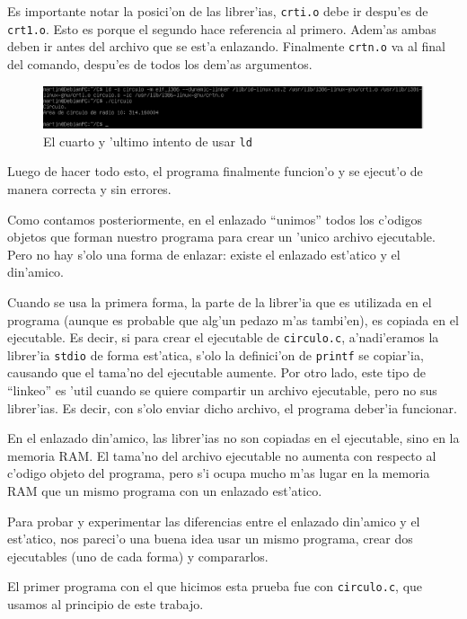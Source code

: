 \documentclass[11pt]{article}
\begin{document}
		Es importante notar la posici'on de las librer'ias, \texttt{crti.o} debe ir despu'es de \texttt{crt1.o}. Esto es porque el segundo hace referencia al primero. Adem'as ambas deben ir antes del archivo que se est'a enlazando. Finalmente \texttt{crtn.o} va al final del comando, despu'es de todos los dem'as argumentos.
		
		\begin{figure}[H]
			\centering
			\includegraphics[width=.9\linewidth]{Images/Seccion 1/S1 parte nueve.PNG}
			\caption{El cuarto y 'ultimo intento de usar \texttt{ld}}
			\label{fig:fourth-ld-attempt}
		\end{figure}
		
		Luego de hacer todo esto, el programa finalmente funcion'o y se ejecut'o de manera correcta y sin errores. 


		Como contamos posteriormente, en el enlazado ``unimos'' todos los c'odigos objetos que forman nuestro programa para crear un 'unico archivo ejecutable. Pero no hay s'olo una forma de enlazar: existe el enlazado est'atico y el din'amico.

		Cuando se usa la primera forma, la parte de la librer'ia que es utilizada en el programa (aunque es probable que alg'un pedazo m'as tambi'en), es copiada en el ejecutable. Es decir, si para crear el ejecutable de \texttt{circulo.c}, a'nadi'eramos la librer'ia \texttt{stdio} de forma est'atica, s'olo la definici'on de \texttt{printf} se copiar'ia, causando que el tama'no del ejecutable aumente. Por otro lado, este tipo de ``linkeo'' es 'util cuando se quiere compartir un archivo ejecutable, pero no sus librer'ias. Es decir, con s'olo enviar dicho archivo, el programa deber'ia funcionar.

		En el enlazado din'amico, las librer'ias no son copiadas en el ejecutable, sino en la memoria RAM. El tama'no del archivo ejecutable no aumenta con respecto al c'odigo objeto del programa, pero s'i ocupa mucho m'as lugar en la memoria RAM que un mismo programa con un enlazado est'atico. 

		Para probar y experimentar las diferencias entre el enlazado din'amico y el est'atico, nos pareci'o una buena idea usar un mismo programa, crear dos ejecutables (uno de cada forma) y compararlos.

		El primer programa con el que hicimos esta prueba fue con \texttt{circulo.c}, que usamos al principio de este trabajo.
\end{document}
